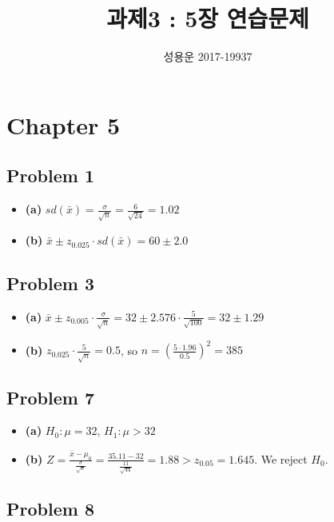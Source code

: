 \documentclass{article}
\title{과제3 : 5장 연습문제}
\author{성용운 2017-19937}
\date{}
\begin{document}
\maketitle

\section*{Chapter 5}

\subsection*{Problem 1}

\begin{itemize}
	\item \textbf{(a)} $sd(\bar{x}) = \frac{\sigma}{\sqrt{n}} = \frac{6}{\sqrt{24}} = 1.02$
	\item \textbf{(b)} $\bar{x} \pm z_{0.025} \cdot sd(\bar{x}) = 60 \pm 2.0$
\end{itemize}

\subsection*{Problem 3}

\begin{itemize}
	\item \textbf{(a)} $\bar{x} \pm z_{0.005} \cdot \frac{\sigma}{\sqrt{n}} = 32 \pm 2.576 \cdot \frac{5}{\sqrt{100}} = 32 \pm 1.29$
	\item \textbf{(b)} $z_{0.025} \cdot \frac{5}{\sqrt{n}} = 0.5$, so $n = (\frac{5 \cdot 1.96}{0.5})^2 = 385$
\end{itemize}

\subsection*{Problem 7}

\begin{itemize}
	\item \textbf{(a)} $H_0: \mu = 32$, $H_1: \mu > 32$
	\item \textbf{(b)} $Z = \frac{\bar{x} - \mu_0}{\frac{\sigma}{\sqrt{n}}} =
		\frac{35.11 - 32}{\frac{11}{\sqrt{44}}} =
		1.88 > z_{0.05} = 1.645$. We reject $H_0$.
\end{itemize}

\subsection*{Problem 8}
\end{document}
